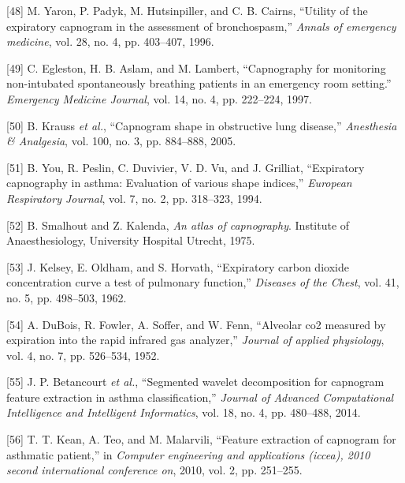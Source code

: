 \documentclass[12pt,]{article}
\begin{document}
\leavevmode\hypertarget{ref-yaron1996utility}{}%
{[}48{]} M. Yaron, P. Padyk, M. Hutsinpiller, and C. B. Cairns,
``Utility of the expiratory capnogram in the assessment of
bronchospasm,'' \emph{Annals of emergency medicine}, vol. 28, no. 4, pp.
403--407, 1996.

\leavevmode\hypertarget{ref-egleston1997capnography}{}%
{[}49{]} C. Egleston, H. B. Aslam, and M. Lambert, ``Capnography for
monitoring non-intubated spontaneously breathing patients in an
emergency room setting.'' \emph{Emergency Medicine Journal}, vol. 14,
no. 4, pp. 222--224, 1997.

\leavevmode\hypertarget{ref-krauss2005capnogram}{}%
{[}50{]} B. Krauss \emph{et al.}, ``Capnogram shape in obstructive lung
disease,'' \emph{Anesthesia \& Analgesia}, vol. 100, no. 3, pp.
884--888, 2005.

\leavevmode\hypertarget{ref-you1994expiratory}{}%
{[}51{]} B. You, R. Peslin, C. Duvivier, V. D. Vu, and J. Grilliat,
``Expiratory capnography in asthma: Evaluation of various shape
indices,'' \emph{European Respiratory Journal}, vol. 7, no. 2, pp.
318--323, 1994.

\leavevmode\hypertarget{ref-smalhout1975atlas}{}%
{[}52{]} B. Smalhout and Z. Kalenda, \emph{An atlas of capnography}.
Institute of Anaesthesiology, University Hospital Utrecht, 1975.

\leavevmode\hypertarget{ref-kelsey1962expiratory}{}%
{[}53{]} J. Kelsey, E. Oldham, and S. Horvath, ``Expiratory carbon
dioxide concentration curve a test of pulmonary function,''
\emph{Diseases of the Chest}, vol. 41, no. 5, pp. 498--503, 1962.

\leavevmode\hypertarget{ref-dubois1952alveolar}{}%
{[}54{]} A. DuBois, R. Fowler, A. Soffer, and W. Fenn, ``Alveolar co2
measured by expiration into the rapid infrared gas analyzer,''
\emph{Journal of applied physiology}, vol. 4, no. 7, pp. 526--534, 1952.

\leavevmode\hypertarget{ref-betancourt2014segmented}{}%
{[}55{]} J. P. Betancourt \emph{et al.}, ``Segmented wavelet
decomposition for capnogram feature extraction in asthma
classification,'' \emph{Journal of Advanced Computational Intelligence
and Intelligent Informatics}, vol. 18, no. 4, pp. 480--488, 2014.

\leavevmode\hypertarget{ref-kean2010feature}{}%
{[}56{]} T. T. Kean, A. Teo, and M. Malarvili, ``Feature extraction of
capnogram for asthmatic patient,'' in \emph{Computer engineering and
applications (iccea), 2010 second international conference on}, 2010,
vol. 2, pp. 251--255.
\end{document}
